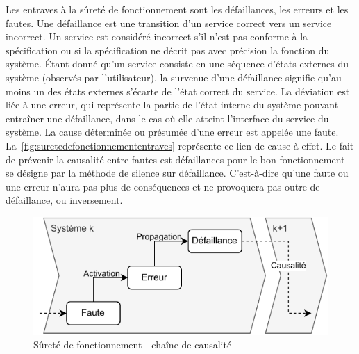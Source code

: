\documentclass[french, a4paper, 11pt, twoside, pdftex]{StyleThese}
\begin{document}
		Les entraves à la sûreté de fonctionnement sont les défaillances, les erreurs et les fautes. Une défaillance est une transition d’un service correct vers un service incorrect. Un service est considéré incorrect s’il n’est pas conforme à la spécification ou si la spécification ne décrit pas avec précision la fonction du système. Étant donné qu’un service consiste en une séquence d’états externes du système (observés par l’utilisateur), la survenue d’une défaillance signifie qu’au moins un des états externes s’écarte de l’état correct du service. La déviation est liée à une erreur, qui représente la partie de l’état interne du système pouvant entraîner une défaillance, dans le cas où elle atteint l’interface du service du système. La cause déterminée ou présumée d’une erreur est appelée une faute. La~\autoref{fig:suretedefonctionnemententraves} représente ce lien de cause à effet. Le fait de prévenir la causalité entre fautes est défaillances pour le bon fonctionnement se désigne par la méthode de silence sur défaillance. C'est-à-dire qu'une faute ou une erreur n'aura pas plus de conséquences et ne provoquera pas outre de défaillance, ou inversement.

		\begin{figure}[ht]
			\centering
			\includegraphics[width=0.7\linewidth]{schemas/SureteDeFonctionnement_Entraves}
			\caption{Sûreté de fonctionnement - chaîne de causalité}
			\label{fig:suretedefonctionnemententraves}
		\end{figure}
\end{document}
